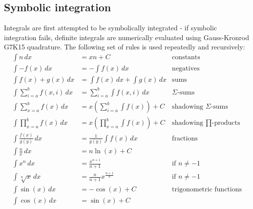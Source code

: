 \documentclass[oneside, a4paper]{article}
\begin{document}
\newpage
\subsection*{Symbolic integration}
Integrals are first attempted to be symbolically integrated - if symbolic integration fails, definite integrals are numerically evaluated using Gauss-Kronrod G7K15 quadrature.
The following set of rules is used repeatedly and recursively:
\begin{align*}
    \int n \,dx                     & = x n + C                                                    & \text{constants}                           \\
    \int -f(x) \,dx                 & = - \int f(x) \,dx                                           & \text{negatives}                           \\
    \int f(x) + g(x) \,dx           & = \int f(x) \,dx  + \int g(x) \,dx                           & \text{sums}                                \\
    \int \sum_{i=a}^{b} f(x,i) \,dx & = \sum_{i=a}^{b} \int f(x,i) \,dx                            & \text{$\Sigma$-sums}                       \\
    \int \sum_{x=a}^{b} f(x) \,dx   & = x \left(\sum_{i=a}^{b} \int f(x)\right) +C                 & \text{shadowing $\Sigma$-sums}             \\
    \int \prod_{x=a}^{b} f(x) \,dx  & = x \left(\prod_{x=a}^{b} \int f(x)\right) +C                & \text{shadowing $\prod$-products}          \\
    \int \frac{f(x)}{g(y)} \,dx     & = \frac{1}{g(y)} \int f(x) \,dx                              & \text{fractions}                           \\
    \int \frac{n}{x} \,dx           & = n \ln(x)     +C                                            & \text{}                                    \\
    \int x^{n} \,dx                 & = \frac{x^{n+1}}{n+1}                                        & \text{if $n\neq -1$}                       \\
    \int \sqrt[n]{x} \,dx           & =  \frac{n}{n+1} x^{\frac{n+1}{n}}                           & \text{if $n\neq -1$}                       \\
    \int \sin(x) \,dx               & = -\cos(x)                                       + C         & \text{trigonometric functions}             \\
    \int \cos(x) \,dx               & = \sin(x)                                        + C         & \text{}                                    \\

\end{align*}
\end{document}
